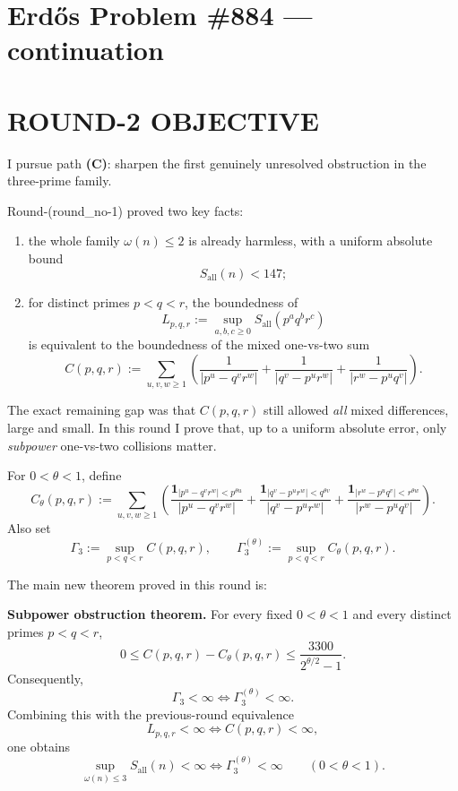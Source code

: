 \section{Erd\H{o}s Problem \#884 --- continuation}

\section{ROUND-2 OBJECTIVE}

I pursue path \textbf{(C)}: sharpen the first genuinely unresolved obstruction in the three-prime family.

Round-(round\_no-1) proved two key facts:

\begin{enumerate}
\item the whole family \(\omega(n)\le 2\) is already harmless, with a uniform absolute bound
\[
S_{\mathrm{all}}(n)<147;
\]
\item for distinct primes \(p<q<r\), the boundedness of
\[
L_{p,q,r}:=\sup_{a,b,c\ge 0} S_{\mathrm{all}}(p^a q^b r^c)
\]
is equivalent to the boundedness of the mixed one-vs-two sum
\[
C(p,q,r):=
\sum_{u,v,w\ge 1}
\left(
\frac{1}{|p^u-q^v r^w|}
+\frac{1}{|q^v-p^u r^w|}
+\frac{1}{|r^w-p^u q^v|}
\right).
\]
\end{enumerate}

The exact remaining gap was that \(C(p,q,r)\) still allowed \emph{all} mixed differences, large and small. In this round I prove that, up to a uniform absolute error, only \emph{subpower} one-vs-two collisions matter.

\medskip

For \(0<\theta<1\), define
\[
C_\theta(p,q,r):=
\sum_{u,v,w\ge 1}
\left(
\frac{\mathbf 1_{|p^u-q^v r^w|<p^{\theta u}}}{|p^u-q^v r^w|}
+
\frac{\mathbf 1_{|q^v-p^u r^w|<q^{\theta v}}}{|q^v-p^u r^w|}
+
\frac{\mathbf 1_{|r^w-p^u q^v|<r^{\theta w}}}{|r^w-p^u q^v|}
\right).
\]
Also set
\[
\Gamma_3:=\sup_{p<q<r} C(p,q,r),
\qquad
\Gamma_3^{(\theta)}:=\sup_{p<q<r} C_\theta(p,q,r).
\]

The main new theorem proved in this round is:

\medskip

\noindent\textbf{Subpower obstruction theorem.}
For every fixed \(0<\theta<1\) and every distinct primes \(p<q<r\),
\[
0\le C(p,q,r)-C_\theta(p,q,r)\le \frac{3300}{2^{\theta/2}-1}.
\]
Consequently,
\[
\Gamma_3<\infty \iff \Gamma_3^{(\theta)}<\infty.
\]
Combining this with the previous-round equivalence
\[
L_{p,q,r}<\infty \iff C(p,q,r)<\infty,
\]
one obtains
\[
\sup_{\omega(n)\le 3} S_{\mathrm{all}}(n)<\infty
\iff
\Gamma_3^{(\theta)}<\infty
\qquad (0<\theta<1).
\]

